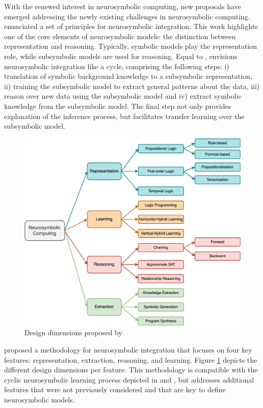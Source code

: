 With the renewed interest in neurosymbolic computing, new proposals have emerged addressing the newly existing challenges in neurosymbolic computing. \cite{besold_neural-symbolic_2017} enunciated a set of principles for neurosymbolic integration. This work highlights one of the core elements of neurosymbolic models: the distinction between representation and reasoning. Typically, symbolic models play the representation role, while subsymbolic models are used for reasoning. Equal to \cite{bader_dimensions_2005}, \cite{besold_neural-symbolic_2017} envisions neurosymbolic integration like a cycle, comprising the following steps: i) translation of symbolic background knowledge to a subsymbolic representation, ii) training the subsymbolic model to extract general patterns about the data, iii) reason over new data using the subsymbolic model and iv) extract symbolic knowledge from the subsymbolic model. The final step not only provides explanation of the inference process, but facilitates transfer learning over the subsymbolic model.

\begin{figure}[h]
    \centering
    \includegraphics[width=.9\linewidth]{2_stateoftheart/figures/garcez_design.eps}
    \caption{Design dimensions proposed by \cite{garcez_neural-symbolic_2019}}
    \label{fig:garcez_design}
\end{figure}

\cite{garcez_neural-symbolic_2019} proposed a methodology for neurosymbolic integration that focuses on four key features: representation, extraction, reasoning, and learning. Figure \ref{fig:garcez_design} depicts the different design dimensions per feature. This methodology is compatible with the cyclic neurosymbolic learning process depicted in \cite{bader_dimensions_2005} and \cite{besold_neural-symbolic_2017}, but addresses additional features that were not previously considered and that are key to define neurosymbolic models.

